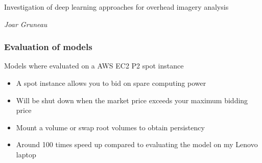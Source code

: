 \documentclass[aspectratio=1610]{beamer}
\begin{document}
\begin{frame}

  \vspace{0.02\textheight}
  
  \begin{Large}
    Investigation of deep learning approaches for overhead imagery analysis 
  \end{Large}

  \vspace{0.1\textheight}

  \begin{small}
    \textit{Joar Gruneau}
  \end{small}
\end{frame}






\begin{frame}
  \frametitle{\hfill Evaluation of models}

  \begin{block}{Models where evaluated on a AWS EC2 P2 spot instance}
    \begin{itemize}
    \item A spot instance allows you to bid on spare computing power
    \item Will be shut down when the market price exceeds your maximum bidding price
    \item Mount a volume or swap root volumes to obtain persistency
    \item Around 100 times speed up compared to evaluating the model on my Lenovo laptop
    \end{itemize}
  \end{block}

\end{frame}
\end{document}
